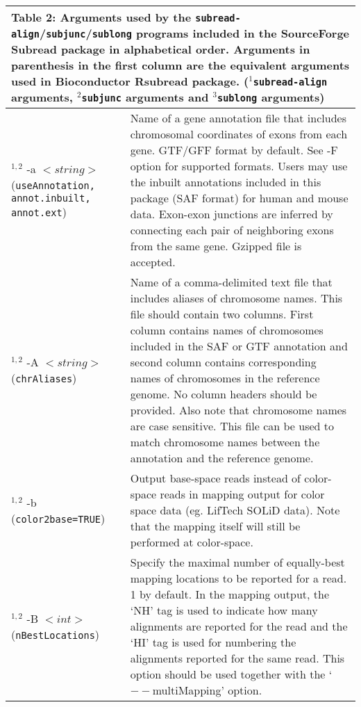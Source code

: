 \documentclass[12pt]{report}
\newcommand{\code}[1]{{\small\texttt{#1}}}
\newcommand{\Subread}{\textsf{Subread}}
\newcommand{\Rsubread}{\textsf{Rsubread}}
\begin{document}
\begin{longtable}{|p{5.5cm}|p{10.5cm}|}
\multicolumn{2}{p{16cm}}{Table 2: Arguments used by the \code{subread-align}/\code{subjunc}/\code{sublong} programs included in the SourceForge {\Subread} package in alphabetical order.
Arguments in parenthesis in the first column are the equivalent arguments used in Bioconductor {\Rsubread} package.
\newline
($^{1}$\code{subread-align} arguments,
$^{2}$\code{subjunc} arguments and
$^{3}$\code{sublong} arguments)
\newline
}
\endfirsthead
\hline
Arguments & Description \\
\hline
$^{1,2}$ -a $<string>$\newline (\code{useAnnotation, annot.inbuilt, annot.ext}) & Name of a gene annotation file that includes chromosomal coordinates of exons from each gene. GTF/GFF format by default. See -F option for supported formats. Users may use the inbuilt annotations included in this package (SAF format) for human and mouse data. Exon-exon junctions are inferred by connecting each pair of neighboring exons from the same gene. Gzipped file is accepted. \\
\hline
$^{1,2}$ -A $<string>$\newline (\code{chrAliases}) & Name of a comma-delimited text file that includes aliases of chromosome names. This file should contain two columns. First column contains names of chromosomes included in the SAF or GTF annotation and second column contains corresponding names of chromosomes in the reference genome. No column headers should be provided. Also note that chromosome names are case sensitive. This file can be used to match chromosome names between the annotation and the reference genome.\\
\hline
$^{1,2}$ -b \newline (\code{color2base=TRUE}) & Output base-space reads instead of color-space reads in mapping output for color space data (eg. LifTech SOLiD data). Note that the mapping itself will still be performed at color-space.\\
\hline
$^{1,2}$ -B $<int>$ \newline (\code{nBestLocations}) & Specify the maximal number of equally-best mapping locations to be reported for a read. 1 by default.  In the mapping output, the `NH' tag is used to indicate how many alignments are reported for the read and the `HI' tag is used for numbering the alignments reported for the same read. This option should be used together with the `$--$multiMapping' option.  \\

\end{longtable}
\end{document}
